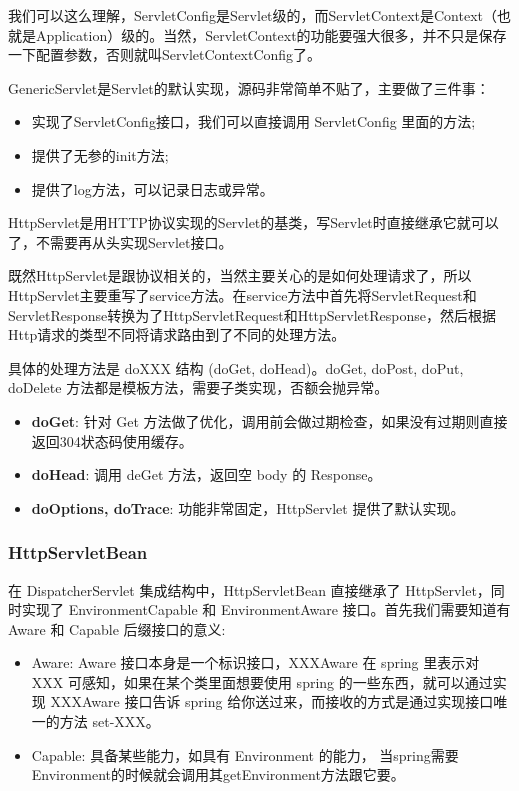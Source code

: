 我们可以这么理解，ServletConfig是Servlet级的，而ServletContext是Context（也就是Application）级的。当然，ServletContext的功能要强大很多，并不只是保存一下配置参数，否则就叫ServletContextConfig了。

GenericServlet是Servlet的默认实现，源码非常简单不贴了，主要做了三件事：

\begin{itemize}
    \item 实现了ServletConfig接口，我们可以直接调用 ServletConfig 里面的方法;
    \item 提供了无参的init方法;
    \item 提供了log方法，可以记录日志或异常。
\end{itemize}

HttpServlet是用HTTP协议实现的Servlet的基类，写Servlet时直接继承它就可以了，不需要再从头实现Servlet接口。

既然HttpServlet是跟协议相关的，当然主要关心的是如何处理请求了，所以HttpServlet主要重写了service方法。在service方法中首先将ServletRequest和ServletResponse转换为了HttpServletRequest和HttpServletResponse，然后根据Http请求的类型不同将请求路由到了不同的处理方法。

具体的处理方法是 doXXX 结构 (doGet, doHead)。doGet, doPost, doPut, doDelete 方法都是模板方法，需要子类实现，否额会抛异常。
\begin{itemize}
    \item \textbf{doGet}: 针对 Get 方法做了优化，调用前会做过期检查，如果没有过期则直接返回304状态码使用缓存。
    \item \textbf{doHead}: 调用 deGet 方法，返回空 body 的 Response。
    \item \textbf{doOptions, doTrace}: 功能非常固定，HttpServlet 提供了默认实现。
\end{itemize}

\subsubsection{HttpServletBean}

在 DispatcherServlet 集成结构中，HttpServletBean 直接继承了 HttpServlet，同时实现了 EnvironmentCapable 和 EnvironmentAware 接口。首先我们需要知道有 Aware 和 Capable 后缀接口的意义:

\begin{itemize}
    \item Aware: Aware 接口本身是一个标识接口，XXXAware 在 spring 里表示对 XXX 可感知，如果在某个类里面想要使用 spring 的一些东西，就可以通过实现 XXXAware 接口告诉 spring 给你送过来，而接收的方式是通过实现接口唯一的方法 set-XXX。
    \item Capable: 具备某些能力，如具有 Environment 的能力， 当spring需要Environment的时候就会调用其getEnvironment方法跟它要。
\end{itemize}

